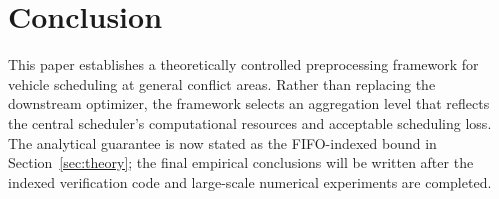 \section{Conclusion}
\label{sec:conclusion}

This paper establishes a theoretically controlled preprocessing framework for vehicle scheduling at general conflict areas. Rather than replacing the downstream optimizer, the framework selects an aggregation level that reflects the central scheduler's computational resources and acceptable scheduling loss. The analytical guarantee is now stated as the FIFO-indexed bound in Section~\ref{sec:theory}; the final empirical conclusions will be written after the indexed verification code and large-scale numerical experiments are completed.
